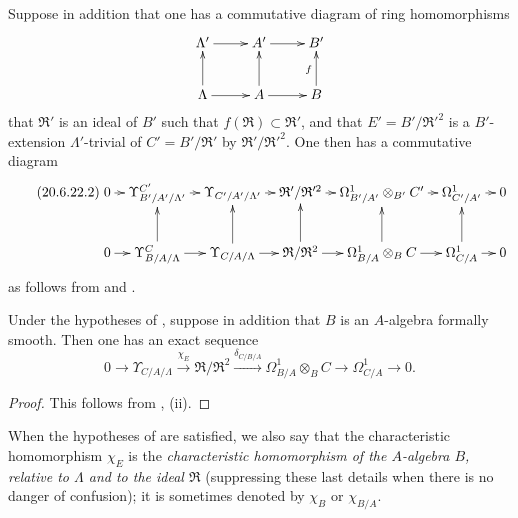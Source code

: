 Suppose in addition that one has a commutative diagram of ring homomorphisms
\[
\xymatrix{
  \Lambda' \ar[r] & A' \ar[r] & B' \\
  \Lambda \ar[u] \ar[r] & A \ar[u] \ar[r] & B \ar[u]^f
}
\]
that $\mathfrak{R}'$ is an ideal of $B'$ such that $f(\mathfrak{R})\subset\mathfrak{R}'$, and that $E'=B'/\mathfrak{R}'^2$ is a $B'$-extension $\Lambda'$-trivial of $C'=B'/\mathfrak{R}'$ by $\mathfrak{R}'/\mathfrak{R}'^2$.
One then has a commutative diagram
\begin{equation}
\tag{20.6.22.2}
\label{0.20.6.22.2}
\xymatrix@C=0.7em{
  0 \ar[r] & \Upsilon^{C'}_{B'/A'/\Lambda'} \ar[r] & \Upsilon_{C'/A'/\Lambda'} \ar[r] & \mathfrak{R}'/\mathfrak{R}'^2 \ar[r] & \Omega^1_{B'/A'}\otimes_{B'} C' \ar[r] & \Omega^1_{C'/A'} \ar[r] & 0 \\
  0 \ar[r] & \Upsilon^C_{B/A/\Lambda} \ar[r] \ar[u] & \Upsilon_{C/A/\Lambda} \ar[r] \ar[u] & \mathfrak{R}/\mathfrak{R}^2 \ar[r] \ar[u] & \Omega^1_{B/A}\otimes_B C \ar[r] \ar[u] & \Omega^1_{C/A} \ar[r] \ar[u] & 0
}
\end{equation}
as follows from  and .

\begin{corollary}[20.6.23]
\label{0.20.6.23}
Under the hypotheses of , suppose in addition that $B$ is an $A$-algebra formally smooth.
Then one has an exact sequence
\begin{equation}
\tag{20.6.23.1}
  \label{0.20.6.23.1}
  0\to\Upsilon_{C/A/\Lambda}\xrightarrow{\chi_E}\mathfrak{R}/\mathfrak{R}^2\xrightarrow{\delta_{C/B/A}}\Omega^1_{B/A}\otimes_B C\to\Omega^1_{C/A}\to 0.
\end{equation}
\end{corollary}

\begin{proof}
This follows from , (ii).
\end{proof}

\begin{env}[20.6.24]
\label{0.20.6.24}
When the hypotheses of  are satisfied, we also say that the characteristic homomorphism $\chi_E$ is the \emph{characteristic homomorphism of the $A$-algebra $B$, relative to $\Lambda$ and to the ideal $\mathfrak{R}$} (suppressing these last details when there is no danger of confusion); it is sometimes denoted by $\chi_B$ or $\chi_{B/A}$.
\end{env}

